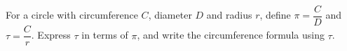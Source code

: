 For a circle with circumference $C$, diameter $D$ and radius $r$, define $\pi=\dfrac{C}{D}$ and $\tau=\dfrac{C}{r}$. Express $\tau$ in terms of $\pi$, and write the circumference formula using $\tau$.

